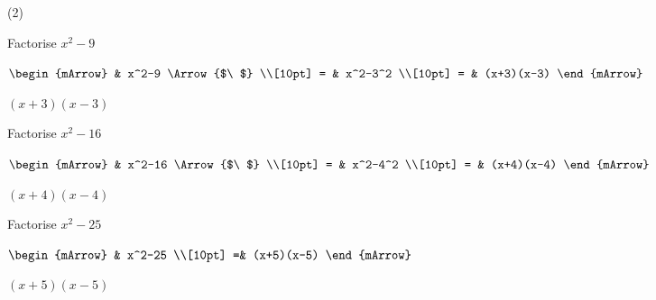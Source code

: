 \begin{mtask}(2)
   \task \begin{exercise} Factorise $x^2-9$\\
            \begin{envSolution}[height=3cm]       
			     $\begin{mArrow}
			             & x^2-9            \Arrow{$\ $} \\[10pt]
                       = & x^2-3^2                       \\[10pt]
                       = & (x+3)(x-3)     				   
	              \end{mArrow}$

                 \begin{shortsolution}  
				       $(x+3)(x-3)$
			     \end{shortsolution}				 
            \end{envSolution}
         \end{exercise}

   \task \begin{exercise} Factorise $x^2-16$\\
            \begin{envSolution}[height=3cm]
			  $\begin{mArrow}
			             & x^2-16            \Arrow{$\ $} \\[10pt]
                       = & x^2-4^2                       \\[10pt]
                       = & (x+4)(x-4)     				   
	           \end{mArrow}$

                 \begin{shortsolution}  
				       $(x+4)(x-4)$
			     \end{shortsolution}				 
            \end{envSolution}
         \end{exercise}

   \task \begin{exercise} Factorise $x^2-25$\\
             \begin{envSolution}
			      
			      $\begin{mArrow}
			           & x^2-25                        \\[10pt]    
					  =& (x+5)(x-5)
				 \end{mArrow}$
                 \begin{shortsolution}  
				       $(x+5)(x-5)$
			     \end{shortsolution}				 
               \end{envSolution}
         \end{exercise}


\end{mtask}
